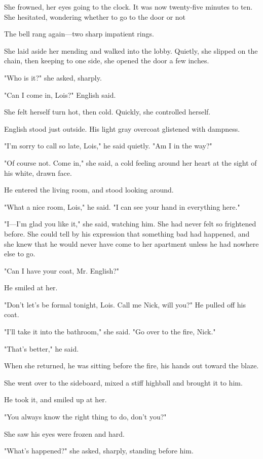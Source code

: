 \documentclass{novel}
\begin{document}
She frowned, her eyes going to the clock. It was now twenty-five minutes to ten. She hesitated, wondering whether to go to the door or not

The bell rang again—two sharp impatient rings.

She laid aside her mending and walked into the lobby. Quietly, she slipped on the chain, then keeping to one side, she opened the door a few inches.

"Who is it?" she asked, sharply.

"Can I come in, Lois?" English said.

She felt herself turn hot, then cold. Quickly, she controlled herself.

English stood just outside. His light gray overcoat glistened with dampness.

"I'm sorry to call so late, Lois," he said quietly. "Am I in the way?"

"Of course not. Come in," she said, a cold feeling around her heart at the sight of his white, drawn face.

He entered the living room, and stood looking around.

"What a nice room, Lois," he said. "I can see your hand in everything here."

"I—I'm glad you like it," she said, watching him. She had never felt so frightened before. She could tell by his expression that something bad had happened, and she knew that he would never have come to her apartment unless he had nowhere else to go.

"Can I have your coat, Mr. English?"

He smiled at her.

"Don't let's be formal tonight, Lois. Call me Nick, will you?" He pulled off his coat.

"I'll take it into the bathroom," she said. "Go over to the fire, Nick."

"That's better," he said.

When she returned, he was sitting before the fire, his hands out toward the blaze.

She went over to the sideboard, mixed a stiff highball and brought it to him.

He took it, and smiled up at her.

"You always know the right thing to do, don't you?"

She saw his eyes were frozen and hard.

"What's happened?" she asked, sharply, standing before him.
\end{document}
